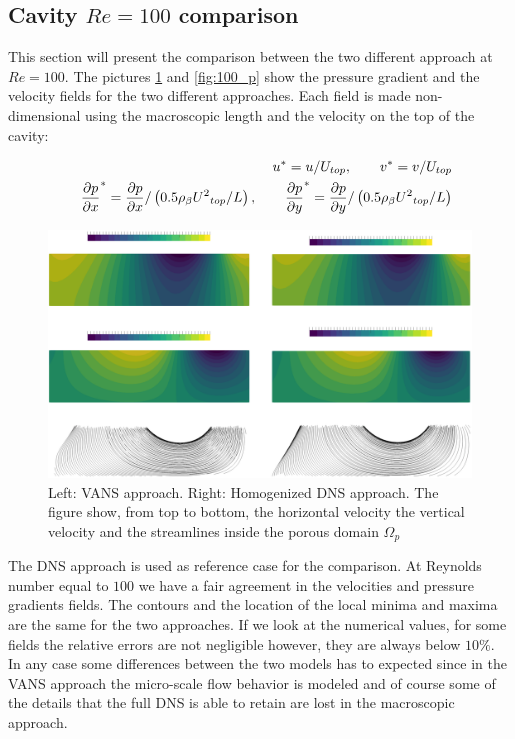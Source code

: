 \subsection{Cavity $Re=100$ comparison}

This section will present the comparison between the two different approach at $Re=100$. The pictures \ref{fig:100_u} and \ref{fig:100_p} show the pressure gradient and the velocity fields for the two different approaches.
Each field is made non-dimensional using the macroscopic length and the velocity on the top of the cavity:

\begin{eqnarray}
&& u^* = u/U_{top}, \qquad v^* = v/U_{top} \nonumber \\
&& \dfrac{\partial p}{\partial x}^* = \dfrac{\partial p}{\partial x} / \left(0.5 \rho_{\beta} {U^2}_{top} /L  \right), \qquad \dfrac{\partial p}{\partial y}^* = \dfrac{\partial p}{\partial y} / \left(0.5 \rho_{\beta} {U^2}_{top} /L  \right) \nonumber
\end{eqnarray}



\begin{figure}[h]
	\centering
	\includegraphics[width=1\linewidth]{chapter_5/figure/re100/vans_u}
	\caption{Left: VANS approach. Right: Homogenized DNS approach. The figure show, from top to bottom, the horizontal velocity the vertical velocity and the streamlines inside the porous domain $\Omega_p$}
	\label{fig:100_u}
\end{figure}

The DNS approach is used as reference case for the comparison. At Reynolds number equal to $100$ we have a fair agreement in the velocities and pressure gradients fields. The contours and the location of the local minima and maxima are the same for the two approaches. If we look at the numerical values, for some fields the relative errors are not negligible however, they are always below $10\%$.
In any case some differences between the two models has to expected since in the VANS approach the micro-scale flow behavior is modeled and of course some of the details that the full DNS is able to retain are lost in the macroscopic approach. 

